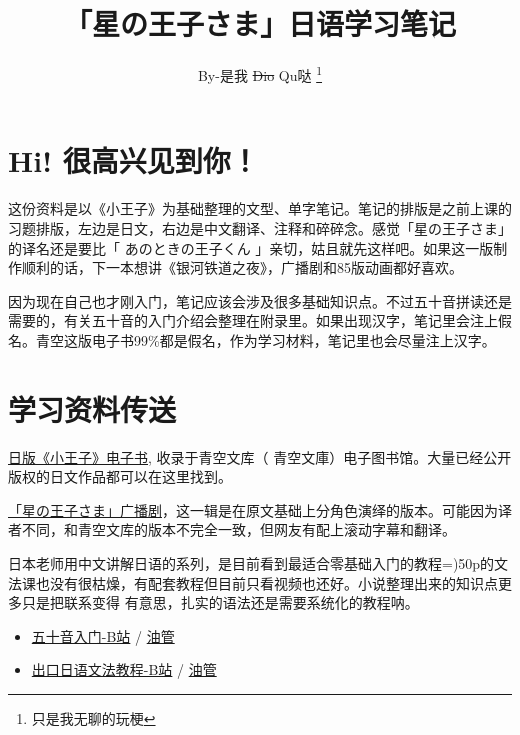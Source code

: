\documentclass{tufte-handout}
\title{「星の王子さま」日语学习笔记}
\author{By-是我 \sout{Dio} Qu哒
\thanks{只是我无聊的玩梗}}
\begin{document}
  \maketitle

\thispagestyle{plain}
\fancyfoot[C]{\thepage}

\section*{\bf{Hi! 很高兴见到你！}}
这份资料是以《小王子》为基础整理的文型、单字笔记。笔记的排版是之前上课的习题排版，左边是日文，右边是中文翻译、注释和碎碎念。感觉「星の王子さま」的译名还是要比「 あのときの王子くん 」亲切，姑且就先这样吧。如果这一版制作顺利的话，下一本想讲《银河铁道之夜》，广播剧和85版动画都好喜欢。

因为现在自己也才刚入门，笔记应该会涉及很多基础知识点。不过五十音拼读还是需要的，有关五十音的入门介绍会整理在附录里。如果出现汉字，笔记里会注上假名。青空这版电子书99\%都是假名，作为学习材料，笔记里也会尽量注上汉字。

\section*{\bf{学习资料传送}}

    \parStar \href{https://www.aozora.gr.jp/cards/001265/files/46817_24670.html}{日版《小王子》电子书}, 收录于青空文库（{ 青空文庫}）电子图书馆。大量已经公开版权的日文作品都可以在这里找到。
    
    \parStar \href{https://music.163.com/#/album?id=3139032}{「星の王子さま」广播剧}，这一辑是在原文基础上分角色演绎的版本。可能因为译者不同，和青空文库的版本不完全一致，但网友有配上滚动字幕和翻译。
    
    \parStar 日本老师用中文讲解日语的系列，是目前看到最适合零基础入门的教程=)50p的文法课也没有很枯燥，有配套教程但目前只看视频也还好。小说整理出来的知识点更多只是把联系变得 有意思，扎实的语法还是需要系统化的教程呐。
    \begin{itemize}
        \setlength\itemsep{0.5em}
        
        \item \href{https://www.bilibili.com/video/BV1mt411M7Uy/?p=6}{五十音入门-B站} / \href{https://www.youtube.com/playlist?list=PLynCeSdpMqxBipKl9EHnBzZFzBnGuB108}{油管}
        
        \item \href{https://www.bilibili.com/video/BV1NJ41187DK?t=48}{出口日语文法教程-B站} / \href{https://www.youtube.com/playlist?list=PLynCeSdpMqxCW-AfMtmIlASAMUVq8wX6k}{油管}
        
    \end{itemize}
    
\end{document}
